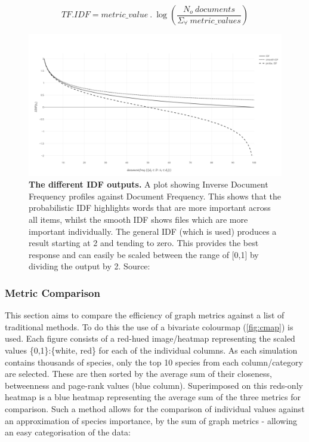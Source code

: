 \begin{equation}
    TF.IDF = metric\_value\  .\ \log(\frac{N_o\ documents}{ \Sigma_\forall\ metric\_values})
\end{equation}


\begin{figure}[H]
     \centering
         \includegraphics[width=\textwidth]{figures_c3/mlpregressor/plotidf.png}
        \caption{ \textbf{The different IDF outputs.} A plot showing Inverse Document Frequency profiles against Document Frequency. This shows that the probabilistic IDF highlights words that are more important across all items, whilst the smooth IDF shows files which are more important individually. The general IDF (which is used) produces a result starting at 2 and tending to zero. This provides the best response and can easily be scaled between the range of [0,1] by dividing the output by 2.  Source: \citep{idfpic}}
        \label{fig:idf}
\end{figure}




\subsubsection{Metric Comparison}

This section aims to compare the efficiency of graph metrics against a list of traditional methods. To do this the use of a bivariate colourmap (\autoref{fig:cmap}) is used. Each figure consists of a red-hued image/heatmap representing the scaled values \{0,1\}:\{white, red\} for each of the individual columns. As each simulation contains thousands of species, only the top 10 species from each column/category are selected. These are then sorted by the average sum of their closeness, betweenness and page-rank values (blue column). Superimposed on this reds-only heatmap is a blue heatmap representing the average sum of the three metrics for comparison. Such a method allows for the comparison of individual values against an approximation of species importance, by the sum of graph metrics - allowing an easy categorisation of the data:

